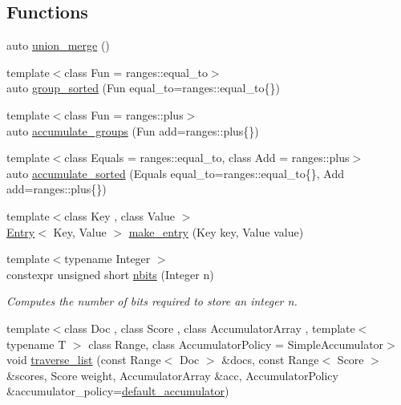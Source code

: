 \subsection*{Functions}
\begin{DoxyCompactItemize}
\item 
auto \hyperlink{namespaceskit_a9a77a1f66da908b18436e900cf702ab3}{union\+\_\+merge} ()
\item 
{\footnotesize template$<$class Fun  = ranges\+::equal\+\_\+to$>$ }\\auto \hyperlink{namespaceskit_aad93ce20d3eee4cb9dea8ed3986f93a5}{group\+\_\+sorted} (Fun equal\+\_\+to=ranges\+::equal\+\_\+to\{\})
\item 
{\footnotesize template$<$class Fun  = ranges\+::plus$>$ }\\auto \hyperlink{namespaceskit_a9c5865c7949c108631955466c92bf042}{accumulate\+\_\+groups} (Fun add=ranges\+::plus\{\})
\item 
{\footnotesize template$<$class Equals  = ranges\+::equal\+\_\+to, class Add  = ranges\+::plus$>$ }\\auto \hyperlink{namespaceskit_af5e774baebeeafedfe9ead9cbab087f5}{accumulate\+\_\+sorted} (Equals equal\+\_\+to=ranges\+::equal\+\_\+to\{\}, Add add=ranges\+::plus\{\})
\item 
{\footnotesize template$<$class Key , class Value $>$ }\\\hyperlink{structskit_1_1Entry}{Entry}$<$ Key, Value $>$ \hyperlink{namespaceskit_a33324a7bd87ff2a6800c5b530cb46a7f}{make\+\_\+entry} (Key key, Value value)
\item 
{\footnotesize template$<$typename Integer $>$ }\\constexpr unsigned short \hyperlink{namespaceskit_a382221ec05008d035dc2d11156c38392}{nbits} (Integer n)
\begin{DoxyCompactList}\small\item\em Computes the number of bits required to store an integer n. \end{DoxyCompactList}\item 
{\footnotesize template$<$class Doc , class Score , class Accumulator\+Array , template$<$ typename T $>$ class Range, class Accumulator\+Policy  = Simple\+Accumulator$>$ }\\void \hyperlink{namespaceskit_ad38cea8db5133ec3f3065bc1de0bfd06}{traverse\+\_\+list} (const Range$<$ Doc $>$ \&docs, const Range$<$ Score $>$ \&scores, Score weight, Accumulator\+Array \&acc, Accumulator\+Policy \&accumulator\+\_\+policy=\hyperlink{namespaceskit_ae63f577a3ddf7bf051ff06113593330e}{default\+\_\+accumulator})

\end{DoxyCompactItemize}
